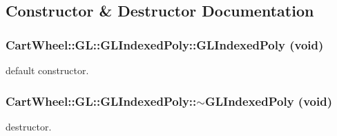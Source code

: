 \subsection{Constructor \& Destructor Documentation}
\hypertarget{classCartWheel_1_1GL_1_1GLIndexedPoly_ad665def1b6752e27cab5c195b5101ed8}{
\subsubsection[{GLIndexedPoly}]{\setlength{\rightskip}{0pt plus 5cm}CartWheel::GL::GLIndexedPoly::GLIndexedPoly (void)}}
\label{classCartWheel_1_1GL_1_1GLIndexedPoly_ad665def1b6752e27cab5c195b5101ed8}
default constructor. \hypertarget{classCartWheel_1_1GL_1_1GLIndexedPoly_a89e44ede1407a525e8cfbb626e4b0fd9}{
\subsubsection[{$\sim$GLIndexedPoly}]{\setlength{\rightskip}{0pt plus 5cm}CartWheel::GL::GLIndexedPoly::$\sim$GLIndexedPoly (void)}}
\label{classCartWheel_1_1GL_1_1GLIndexedPoly_a89e44ede1407a525e8cfbb626e4b0fd9}
destructor. 

